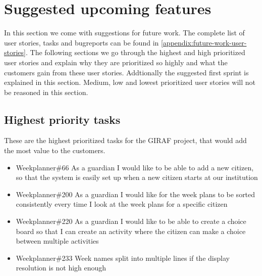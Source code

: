 \section{Suggested upcoming features}
In this section we come with suggestions for future work. 
The complete list of user stories, tasks and bugreports can be found in \autoref{appendix:future-work-user-stories}.
The following sections we go through the highest and high prioritized user stories and explain why they are prioritized so highly and what the customers gain from these user stories.
Addtionally the suggested first sprint is explained in this section.
Medium, low and lowest prioritized user stories will not be reasoned in this section.

\subsection{Highest priority tasks}\label{highest-priority-tasks}
These are the highest prioritized tasks for the GIRAF project, that would add the most value to the customers.

\begin{itemize}
    \item Weekplanner\#66 As a guardian I would like to be able to add a new citizen, so that the system is easily set up when a new citizen starts at our institution
    \item Weekplanner\#200 As a guardian I would like for the week plans to be sorted consistently every time I look at the week plans for a specific citizen
    \item Weekplanner\#220 As a guardian I would like to be able to create a choice board so that I can create an activity where the citizen can make a choice between multiple activities 
    \item Weekplanner\#233 Week names split into multiple lines if the display resolution is not high enough 
\end{itemize}

